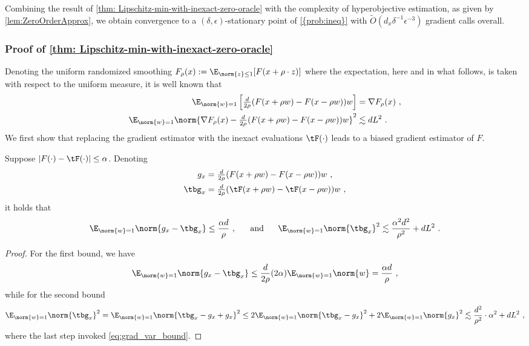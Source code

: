 Combining the result of \cref{thm: Lipschitz-min-with-inexact-zero-oracle} with the complexity of hyperobjective estimation,
as given by \cref{lem:ZeroOrderApprox},
we obtain convergence to a $(\delta,\epsilon)$-stationary point of  \cref{{prob:ineq}} with $\widetilde{O}(d_x\delta^{-1}\epsilon^{-3})$ gradient calls overall.




\subsubsection{Proof of \cref{thm: Lipschitz-min-with-inexact-zero-oracle}}


Denoting the uniform randomized smoothing $F_\rho(x):=\E_{\norm{z}\leq1}[F(x+\rho\cdot z)]$ where the expectation, here and in what follows, is taken with respect to the uniform measure, it is well known \citep[Lemma 10]{shamir2017optimal} that
\begin{align}
\E_{\norm{w}=1}\left[\tfrac{d}{2\rho}(F(x+\rho w)-F(x-\rho w)) w\right]
&=\nabla F_\rho( x)~,
\nonumber
\\
\E_{ \norm{w}=1}\norm{\nabla F_\rho( x)-\tfrac{d}{2\rho}( F( x+\rho w)- F( x-\rho w)) w}^2
&\lesssim dL^2~.\label{eq:grad_var_bound}
\end{align}
We first show that replacing the gradient estimator with the inexact evaluations $\tF(\cdot)$ leads to a biased gradient estimator of $ F$.

\begin{lemma}\label{lem: inexact gradient}
Suppose $| F(\cdot)-\tF(\cdot)|\leq\alpha$. Denoting
\begin{align*}
 g_x&=\tfrac{d}{2\rho}( F( x+\rho w)- F( x-\rho w)) w~,
\\
\tbg_x&=\tfrac{d}{2\rho}(\tF(x+\rho w)-\tF( x-\rho w)) w~,
\end{align*}
it holds that
\[
\E_{ \norm{w}=1}\norm{ g_x-\tbg_x}\leq\frac{\alpha d}{\rho}~,
~~~~~\text{and}~~~~~
\E_{\norm{w}=1}\norm{\tbg_x}^2\lesssim \frac{\alpha^2 d^2}{\rho^2}+dL^2~.
\]
\end{lemma}

\begin{proof}
For the first bound, we have
\[
\E_{\norm{w}=1}\norm{g_x-\tbg_x}
\leq \frac{d}{2\rho}(2\alpha)\E_{\norm{w}=1}\norm{w}
=\frac{\alpha d}{\rho}~,
\]
while for the second bound
\[
\E_{\norm{w}=1}\norm{\tbg_x}^2
=\E_{\norm{w}=1}\norm{\tbg_x-g_x+g_x}^2
\leq 2\E_{\norm{w}=1}\norm{\tbg_x-g_x}^2+2\E_{\norm{w}=1}\norm{g_x}^2
\lesssim \frac{d^2}{\rho^2}\cdot\alpha^2+dL^2~,
\]
where the last step invoked \cref{eq:grad_var_bound}.
\end{proof}

